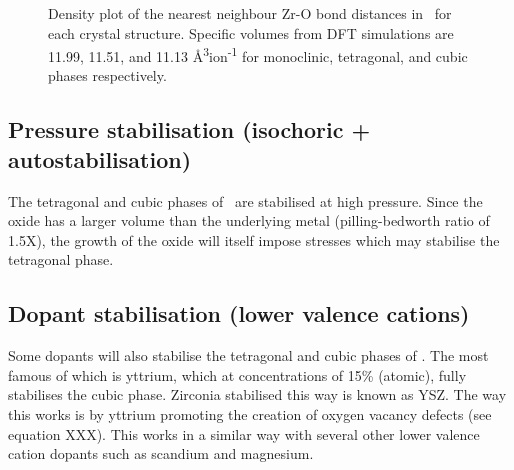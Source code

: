 \begin{figure}
\begin{center}
		\caption{Density plot of the nearest neighbour Zr-O bond distances in \zirconia\ for each crystal structure. Specific volumes from DFT simulations are 11.99, 11.51, and 11.13 \r{A}\textsuperscript{3}ion\textsuperscript{-1} for monoclinic, tetragonal, and cubic phases respectively.}
		\label{figure:zrobonddistance}
	\end{center}
\end{figure}


\subsection{Pressure stabilisation (isochoric + autostabilisation)}

The tetragonal and cubic phases of \zirconia\ are stabilised at high pressure. Since the oxide has a larger volume than the underlying metal (pilling-bedworth ratio of 1.5X), the growth of the oxide will itself impose stresses which may stabilise the tetragonal phase.

\subsection{Dopant stabilisation (lower valence cations)}

Some dopants will also stabilise the tetragonal and cubic phases of \zirconia. The most famous of which is yttrium, which at concentrations of 15\% (atomic), fully stabilises the cubic phase. Zirconia stabilised this way is known as YSZ. The way this works is by yttrium promoting the creation of oxygen vacancy defects (see equation XXX). This works in a similar way with several other lower valence cation dopants such as scandium and magnesium.

